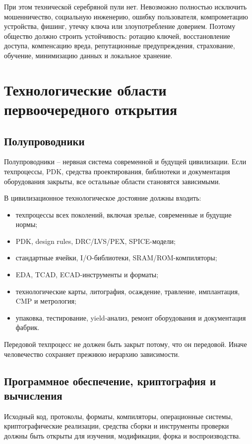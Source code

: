 \documentclass[11pt,a4paper]{article}
\begin{document}
При этом технической серебряной пули нет. Невозможно полностью исключить мошенничество, социальную инженерию, ошибку пользователя, компрометацию устройства, фишинг, утечку ключа или злоупотребление доверием. Поэтому общество должно строить устойчивость: ротацию ключей, восстановление доступа, компенсацию вреда, репутационные предупреждения, страхование, обучение, минимизацию данных и локальное хранение.

\section{Технологические области первоочередного открытия}

\subsection{Полупроводники}

Полупроводники -- нервная система современной и будущей цивилизации. Если техпроцессы, PDK, средства проектирования, библиотеки и документация оборудования закрыты, все остальные области становятся зависимыми.

В цивилизационное технологическое достояние должны входить:

\begin{itemize}
  \item техпроцессы всех поколений, включая зрелые, современные и будущие нормы;
  \item PDK, design rules, DRC/LVS/PEX, SPICE-модели;
  \item стандартные ячейки, I/O-библиотеки, SRAM/ROM-компиляторы;
  \item EDA, TCAD, ECAD-инструменты и форматы;
  \item технологические карты, литография, осаждение, травление, имплантация, CMP и метрология;
  \item упаковка, тестирование, yield-анализ, ремонт оборудования и документация фабрик.
\end{itemize}

Передовой техпроцесс не должен быть закрыт потому, что он передовой. Иначе человечество сохраняет прежнюю иерархию зависимости.

\subsection{Программное обеспечение, криптография и вычисления}

Исходный код, протоколы, форматы, компиляторы, операционные системы, криптографические реализации, средства сборки и инструменты проверки должны быть открыты для изучения, модификации, форка и воспроизводства.
\end{document}
